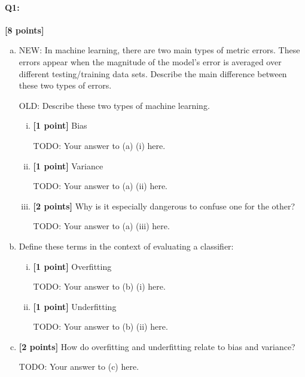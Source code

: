  
 


\pagebreak

\paragraph{Q1:} \textbf{[8 points]}

\begin{enumerate} [(a)]
    \item NEW: In machine learning, there are two main types of metric errors. These errors appear when the magnitude of the model's error is averaged over different testing/training data sets. Describe the main difference between these two types of errors.
    
    OLD: Describe these two types of machine learning.
    \begin{enumerate} [(i)]
    \item \textbf{[1 point]} Bias
    \begin{mdframed}
    TODO: Your answer to (a) (i) here.
    \end{mdframed}
    \item \textbf{[1 point]} Variance
    \begin{mdframed}
    TODO: Your answer to (a) (ii) here.
    \end{mdframed}
    \item \textbf{[2 points]} Why is it especially dangerous to confuse one for the other?
    \begin{mdframed}
    TODO: Your answer to (a) (iii) here.
    \end{mdframed}
    \end{enumerate}
    \item Define these terms in the context of evaluating a classifier:
    
    \begin{enumerate} [(i)]
    \item \textbf{[1 point]} Overfitting
    \begin{mdframed}
    TODO: Your answer to (b) (i) here.
    \end{mdframed}
    \item \textbf{[1 point]} Underfitting
    \begin{mdframed}
    TODO: Your answer to (b) (ii) here.
    \end{mdframed}
    \end{enumerate}
    \item \textbf{[2 points]} How do overfitting and underfitting relate to bias and variance?
    \begin{mdframed}
    TODO: Your answer to (c) here.
    \end{mdframed}
\end{enumerate}

